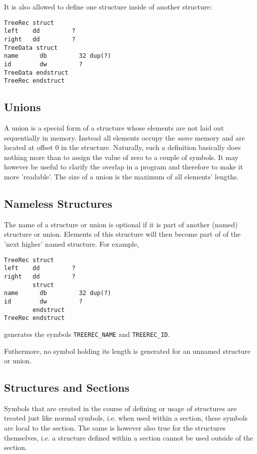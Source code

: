 \documentclass[12pt,twoside]{report}
\begin{document}
It is also allowed to define one structure inside of another
structure:
\begin{verbatim}
TreeRec struct
left    dd         ?
right   dd         ?
TreeData struct
name      db         32 dup(?)
id        dw         ?
TreeData endstruct
TreeRec endstruct
\end{verbatim}

\subsection{Unions}

A union is a special form of a structure whose elements are not laid out
sequentially in memory.  Instead all elements occupy the {\em same}
memory and are located at offset 0 in the structure.  Naturally, such a
definition basically does nothing more than to assign the value of zero to
a couple of symbols.  It may however be useful to clarify the overlap in a
program and therefore to make it more 'readable'.  The size of a union is
the maximum of all elements' lengths.

\subsection{Nameless Structures}

The name of a structure or union is optional if it is part of
another (named) structure or union.  Elements of this structure
will then become part of of the 'next higher' named structure.
For example,
\begin{verbatim}
TreeRec struct
left    dd         ?
right   dd         ?
        struct
name      db         32 dup(?)
id        dw         ?
        endstruct
TreeRec endstruct
\end{verbatim}
generates the symbols {\tt TREEREC\_NAME} and {\tt TREEREC\_ID}.

Futhermore, no symbol holding its length is generated for an
unnamed structure or union.

\subsection{Structures and Sections}

Symbols that are created in the course of defining or usage of structures
are treated just like normal symbols, i.e. when used within a section,
these symbols are local to the section.  The same is however also true for
the structures themselves, i.e. a structure defined within a section
cannot be used outside of the section.
\end{document}
